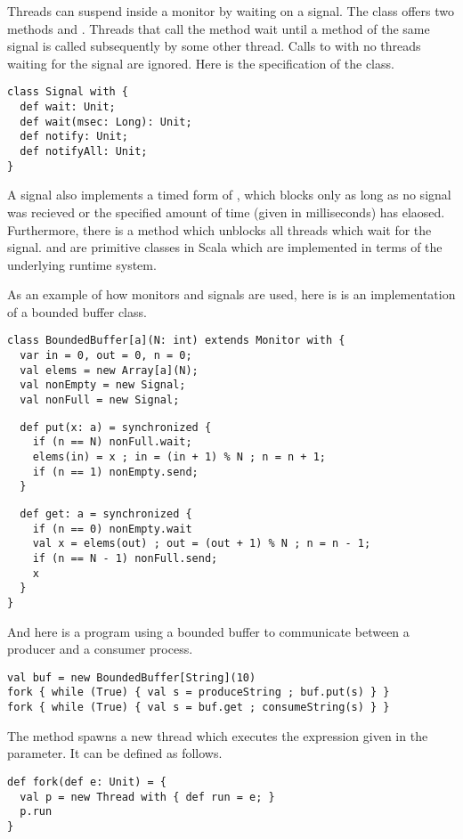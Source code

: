 \documentclass[11pt]{report}
\begin{document}
Threads can suspend inside a monitor by waiting on a signal.  The
\verb@Signal@ class offers two methods \verb@send@ and
\verb@wait@.  Threads that call the \verb@wait@ method wait until a
\verb@send@ method of the same signal is called subsequently by some
other thread. Calls to \verb@send@ with no threads waiting for the
signal are ignored. Here is the specification of the \verb@Signal@
class.
\begin{verbatim}
class Signal with {
  def wait: Unit;
  def wait(msec: Long): Unit;
  def notify: Unit;
  def notifyAll: Unit;
}
\end{verbatim}
A signal also implements a timed form of \verb@wait@, which blocks
only as long as no signal was recieved or the specified amount of time
(given in milliseconds) has elaosed. Furthermore, there is a
\verb@notifyAll@ method which unblocks all threads which wait for the
signal. \verb@Signal@ and \verb@Monitor@ are primitive classes in
Scala which are implemented in terms of the underlying runtime system.

As an example of how monitors and signals are used, here is is an
implementation of a bounded buffer class.
\begin{verbatim}
class BoundedBuffer[a](N: int) extends Monitor with {
  var in = 0, out = 0, n = 0;
  val elems = new Array[a](N);
  val nonEmpty = new Signal;
  val nonFull = new Signal;
\end{verbatim}
\begin{verbatim}
  def put(x: a) = synchronized {
    if (n == N) nonFull.wait;
    elems(in) = x ; in = (in + 1) % N ; n = n + 1;
    if (n == 1) nonEmpty.send;
  }
\end{verbatim}
\begin{verbatim}
  def get: a = synchronized {
    if (n == 0) nonEmpty.wait
    val x = elems(out) ; out = (out + 1) % N ; n = n - 1;
    if (n == N - 1) nonFull.send;
    x
  }
}
\end{verbatim}
And here is a program using a bounded buffer to communicate between a
producer and a consumer process.
\begin{verbatim}
val buf = new BoundedBuffer[String](10)
fork { while (True) { val s = produceString ; buf.put(s) } }
fork { while (True) { val s = buf.get ; consumeString(s) } }
\end{verbatim}
The \verb@fork@ method spawns a new thread which executes the
expression given in the parameter. It can be defined as follows.
\begin{verbatim}
def fork(def e: Unit) = {
  val p = new Thread with { def run = e; }
  p.run
}
\end{verbatim}
\end{document}
